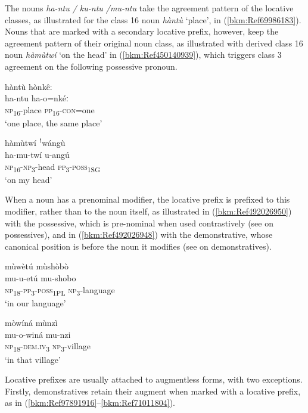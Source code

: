 The nouns \textit{ha-ntu / ku-ntu /mu-ntu} take the agreement pattern of the locative classes, as illustrated for the class 16 noun \textit{hàntù} ‘place’, in (\ref{bkm:Ref69986183}). Nouns that are marked with a secondary locative prefix, however, keep the agreement pattern of their original noun class, as illustrated with derived class 16 noun \textit{hàmùtwí} ‘on the head’ in (\ref{bkm:Ref450140939}), which triggers class 3 agreement on the following possessive pronoun.

\ea
\label{bkm:Ref69986183}
hàntù hònkêː\\
\gll ha-ntu  ha-o=nkéː\\
\textsc{np}\textsubscript{16}-place  \textsc{pp}\textsubscript{16}-\textsc{con}=one\\
\glt ‘one place, the same place’
\z

\ea
\label{bkm:Ref450140939}
hàmùtwí ꜝwángù\\
\gll ha-mu-twí    u-angú\\
\textsc{np}\textsubscript{16}-\textsc{np}\textsubscript{3}-head  \textsc{pp}\textsubscript{3}-\textsc{poss}\textsubscript{1SG}\\
\glt ‘on my head’
\z

When a noun has a prenominal modifier, the locative prefix is prefixed to this modifier, rather than to the noun itself, as illustrated in (\ref{bkm:Ref492026950}) with the possessive, which is pre-nominal when used contrastively (see  on possessives), and in (\ref{bkm:Ref492026948}) with the demonstrative, whose canonical position is before the noun it modifies (see  on demonstratives).

\ea
\label{bkm:Ref492026950}
mùwètú mùshòbò\\
\gll mu-u-etú    mu-shobo\\
\textsc{np}\textsubscript{18}-\textsc{pp}\textsubscript{3}-\textsc{poss}\textsubscript{1PL}  \textsc{np}\textsubscript{3}-language\\
\glt ‘in our language’
\z

\ea
\label{bkm:Ref492026948}
mòwíná mùnzì\\
\gll mu-o-winá  mu-nzi\\
\textsc{np}\textsubscript{18}-\textsc{dem}.\textsc{iv}\textsubscript{3}  \textsc{np}\textsubscript{3}-village\\
\glt ‘in that village’
\z

Locative prefixes are usually attached to augmentless forms, with two exceptions. Firstly, demonstratives retain their augment when marked with a locative prefix, as in (\ref{bkm:Ref97891916}--\ref{bkm:Ref71011804}).

